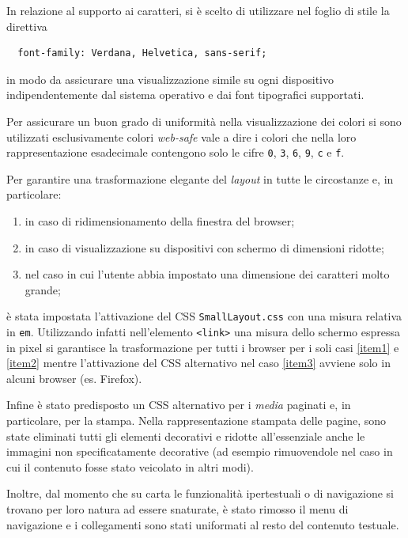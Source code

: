 \documentclass[10pt,a4paper,onecolumn]{article}
\newcommand{\inglese}[1]{\foreignlanguage{english}{\itshape{}#1}}
\begin{document}
In relazione al supporto ai caratteri, si è scelto di utilizzare nel foglio di stile la direttiva
\begin{verbatim}
  font-family: Verdana, Helvetica, sans-serif;
\end{verbatim}
in modo da assicurare una visualizzazione simile su ogni dispositivo indipendentemente dal sistema operativo e dai font tipografici supportati.

Per assicurare un buon grado di uniformità nella visualizzazione dei colori si sono utilizzati esclusivamente colori \inglese{web-safe} vale a dire i colori che nella loro rappresentazione esadecimale contengono solo le cifre \verb+0+, \verb+3+, \verb+6+, \verb+9+, \verb+c+ e \verb+f+.

Per garantire una trasformazione elegante del \inglese{layout} in tutte le circostanze e, in particolare:
\begin{enumerate}[noitemsep,nolistsep,label=\emph{\alph*})]
  \item\label{item1} in caso di ridimensionamento della finestra del browser;
  \item\label{item2} in caso di visualizzazione su dispositivi con schermo di dimensioni ridotte;
  \item\label{item3} nel caso in cui l'utente abbia impostato una dimensione dei caratteri molto grande;
\end{enumerate}
è stata impostata l'attivazione del CSS \texttt{SmallLayout.css} con una misura relativa in \texttt{em}. Utilizzando infatti nell'elemento \texttt{<link>} una misura dello schermo espressa in pixel si garantisce la trasformazione per tutti i browser per i soli casi \ref{item1} e \ref{item2} mentre l'attivazione del CSS alternativo nel caso \ref{item3} avviene solo in alcuni browser (es. Firefox).

Infine è stato predisposto un CSS alternativo per i \inglese{media} paginati e, in particolare, per la stampa. Nella rappresentazione stampata delle pagine, sono state eliminati tutti gli elementi decorativi e ridotte all'essenziale anche le immagini non specificatamente decorative (ad esempio rimuovendole nel caso in cui il contenuto fosse stato veicolato in altri modi).

Inoltre, dal momento che su carta le funzionalità ipertestuali o di navigazione si trovano per loro natura ad essere snaturate, è stato rimosso il menu di navigazione e i collegamenti sono stati uniformati al resto del contenuto testuale.
\end{document}
